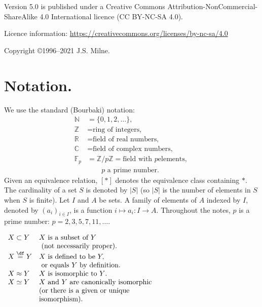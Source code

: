 \documentclass[a4paper,11pt,final,openany]{memoir}
\theoremstyle{nonumberplain}
\begin{document}
\vfill

\noindent Version 5.0 is published under a Creative Commons
Attribution-NonCommercial-ShareAlike 4.0 International licence
(CC BY-NC-SA 4.0).

\bigskip

\noindent Licence information:
\href{https://creativecommons.org/licenses/by-nc-sa/4.0/}{https://creativecommons.org/licenses/by-nc-sa/4.0}

\bigskip
\noindent Copyright \copyright 1996--2021 J.S. Milne.

\setcounter{page}{2} \clearpage \pagestyle{plain} \vspace*{0in}

\tableoc\clearpage


\section{Notation.}

\sloppy We use the standard (Bourbaki) notation:
\begin{align*}
\mathbb{N}  &  =\{0,1,2,\ldots\},\\
\mathbb{Z}  &  =\text{ring of integers,}\\
\mathbb{R}{}  &  =\text{field of real numbers,}\\
\mathbb{C}{}  &  =\text{field of complex numbers,}\\
\mathbb{F}_{p}  &  =\mathbb{Z}{}/p\mathbb{Z}{}=\text{field with }p\text{
  elements, }\\
& \qquad p\text{ a prime number.}%
\end{align*}
Given an equivalence relation, $[\ast]$ denotes the equivalence class
containing $\ast$. The cardinality of a set $S$ is denoted by $\left\vert
S\right\vert $ (so $\left\vert S\right\vert $ is the number of elements in
$S$when $S$ is finite). Let $I$ and $A$ be sets. A family of elements of $A$
indexed by $I$, denoted by $(a_{i})_{i\in I}$, is a function $i\mapsto
a_{i}\colon I\rightarrow A$. Throughout the notes, $p$ is a prime number:
$p=2,3,5,7,11,\ldots$.

$%
\begin{array}
[c]{ll}%
X\subset Y & X\text{ is a subset of }Y\\
 & \text{ (not necessarily proper).}\\
X\overset{\df}{=}Y & X\text{ is defined to be }Y,\\
 & \text{ or
equals }Y\text{ by definition.}\\
X\approx Y & X\text{ is isomorphic to }Y\text{.}\\
X\simeq Y & X\text{ and }Y\text{ are canonically isomorphic}\\
 & \text{(or there is a
  given or unique }\\
& \text{isomorphism).}%
\end{array}
$
\end{document}
